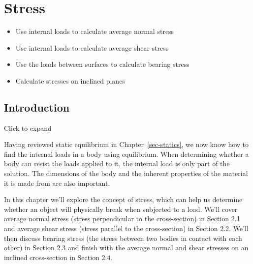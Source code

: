\documentclass[
  letterpaper,
  DIV=11,
  numbers=noendperiod]{scrreprt}
\providecommand{\tightlist}{%
  \setlength{\itemsep}{0pt}\setlength{\parskip}{0pt}}\usepackage{longtable,booktabs,array}
\begin{document}

\chapter{Stress}\label{sec-stress}

\begin{tcolorbox}[enhanced jigsaw, breakable, opacityback=0, toptitle=1mm, left=2mm, colback=white, opacitybacktitle=0.6, colframe=quarto-callout-note-color-frame, titlerule=0mm, arc=.35mm, leftrule=.75mm, bottomtitle=1mm, colbacktitle=quarto-callout-note-color!10!white, rightrule=.15mm, title={Learning Objectives}, bottomrule=.15mm, toprule=.15mm, coltitle=black]

\begin{itemize}
\tightlist
\item
  Use internal loads to calculate average normal stress
\item
  Use internal loads to calculate average shear stress
\item
  Use the loads between surfaces to calculate bearing stress
\item
  Calculate stresses on inclined planes
\end{itemize}

\end{tcolorbox}

\section*{Introduction}\label{introduction-2}


Click to expand

Having reviewed static equilibrium in Chapter~\ref{sec-statics}, we now
know how to find the internal loads in a body using equilibrium. When
determining whether a body can resist the loads applied to it, the
internal load is only part of the solution. The dimensions of the body
and the inherent properties of the material it is made from are also
important.

In this chapter we'll explore the concept of stress, which can help us
determine whether an object will physically break when subjected to a
load. We'll cover average normal stress (stress perpendicular to the
cross-section) in Section 2.1 and average shear stress (stress parallel
to the cross-section) in Section 2.2. We'll then discuss bearing stress
(the stress between two bodies in contact with each other) in Section
2.3 and finish with the average normal and shear stresses on an inclined
cross-section in Section 2.4.
\end{document}
